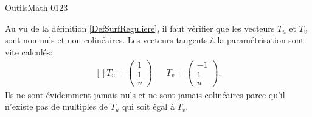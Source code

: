 
\begin{corrige}{OutilsMath-0123}

    Au vu de la définition \ref{DefSurfReguliere}, il faut vérifier que les vecteurs \( T_u\) et \( T_v\) sont non nuls et non colinéaires. Les vecteurs tangents à la paramétrisation sont vite calculés:
    \begin{equation}
        \begin{aligned}[]
            T_u=\begin{pmatrix}
                1    \\ 
                1    \\ 
                v    
            \end{pmatrix}&&T_v=\begin{pmatrix}
                -1    \\ 
                1    \\ 
                u    
            \end{pmatrix}.
        \end{aligned}
    \end{equation}
    Ils ne sont évidemment jamais nuls et ne sont jamais colinéaires parce qu'il n'existe pas de multiples de \( T_u\) qui soit égal à \( T_v\).


\end{corrige}
